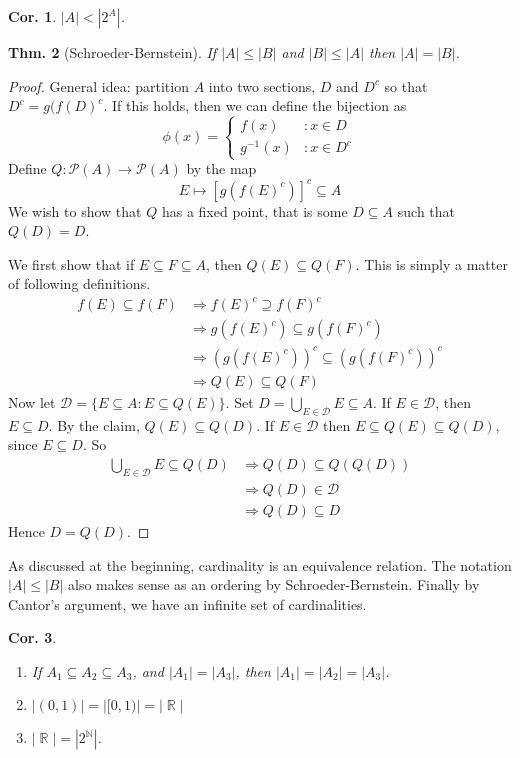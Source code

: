 \documentclass[12pt, a4paper]{book}
\DeclareMathOperator{\N}{\mathbb{N}}
\DeclareMathOperator{\R}{\mathbb{R}}
\newtheorem{theorem}{Thm.}[section]
\newtheorem{corollary}[theorem]{Cor.}
\theoremstyle{nonumberplain}
\newtheorem{proof}{Proof}
\begin{document}
\begin{corollary}
    $|A|<|2^A|$.
\end{corollary}
\begin{theorem}[Schroeder-Bernstein]
    If $|A|\leq|B|$ and $|B|\leq|A|$ then $|A|=|B|$.
\end{theorem}
\begin{proof}
    General idea: partition $A$ into two sections, $D$ and $D^c$ so that $D^c=g(f(D)^c$. If this holds, then we can define
    the bijection as
    \[\phi(x)=
    \begin{cases}
        f(x)&:x\in D\\
        g^{-1}(x)&:x\in D^c
    \end{cases}
    \]
    Define $Q:\mathcal{P}(A)\to\mathcal{P}(A)$ by the map
    \[E\mapsto\left[g(f(E)^c)\right]^c\subseteq A\]
    We wish to show that $Q$ has a fixed point, that is some $D\subseteq A$ such that $Q(D)=D$.

    We first show that if $E\subseteq F\subseteq A$, then $Q(E)\subseteq Q(F)$. This is simply a matter of following
    definitions.
    \begin{align*}
        f(E)\subseteq f(F)&\Rightarrow f(E)^c\supseteq f(F)^c\\
        &\Rightarrow g(f(E)^c)\subseteq g(f(F)^c)\\
        &\Rightarrow (g(f(E)^c))^c\subseteq (g(f(F)^c))^c\\
        &\Rightarrow Q(E)\subseteq Q(F)
    \end{align*}
    Now let $\mathcal{D}=\{E\subseteq A:E\subseteq Q(E)\}$. Set $D=\bigcup_{E\in\mathcal{D}}E\subseteq A$. If
    $E\in\mathcal{D}$, then $E\subseteq D$. By the claim, $Q(E)\subseteq Q(D)$. If $E\in\mathcal{D}$ then
    $E\subseteq Q(E)\subseteq Q(D)$, since $E\subseteq D$. So
    \begin{align*}
        \bigcup_{E\in\mathcal{D}}E\subseteq Q(D) &\Rightarrow Q(D)\subseteq Q(Q(D))\\
        &\Rightarrow Q(D)\in\mathcal{D}\\
        &\Rightarrow Q(D)\subseteq D
    \end{align*}
    Hence $D=Q(D)$.

\end{proof}
As discussed at the beginning, cardinality is an equivalence relation. The notation $|A|\leq|B|$ also makes sense as an
ordering by Schroeder-Bernstein. Finally by Cantor's argument, we have an infinite set of cardinalities.
\begin{corollary}\hspace{1cm}
    \begin{enumerate}
        \item If $A_1\subseteq A_2\subseteq A_3$, and $|A_1|=|A_3|$, then $|A_1|=|A_2|=|A_3|$.
        \item $|(0,1)|=|[0,1)|=|\R|$
        \item $|\R|=|2^{\N}|$.
    \end{enumerate}
\end{corollary}
\end{document}
